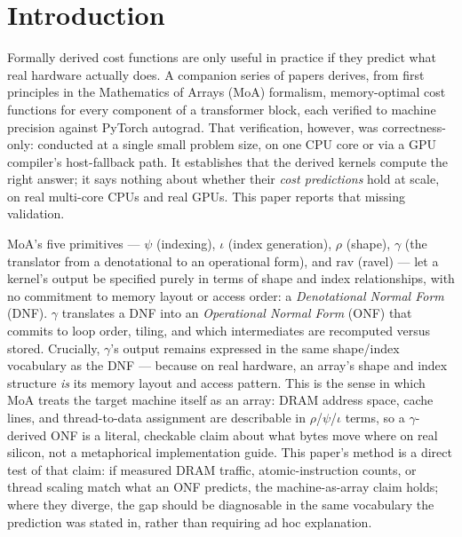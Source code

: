 \documentclass[conference]{IEEEtran}
\begin{document}
\section{Introduction}

Formally derived cost functions are only useful in practice if they
predict what real hardware actually does. A companion series of papers
derives, from first principles in the Mathematics of Arrays (MoA)
formalism, memory-optimal cost functions for every component of a
transformer block, each verified to machine precision against PyTorch
autograd. That verification, however, was correctness-only: conducted
at a single small problem size, on one CPU core or via a GPU compiler's
host-fallback path. It establishes that the derived kernels compute the
right answer; it says nothing about whether their \emph{cost
predictions} hold at scale, on real multi-core CPUs and real GPUs. This
paper reports that missing validation.

MoA's five primitives --- $\psi$ (indexing), $\iota$ (index
generation), $\rho$ (shape), $\gamma$ (the translator from a
denotational to an operational form), and $\mathrm{rav}$ (ravel) ---
let a kernel's output be specified purely in terms of shape and index
relationships, with no commitment to memory layout or access order: a
\emph{Denotational Normal Form} (DNF). $\gamma$ translates a DNF into
an \emph{Operational Normal Form} (ONF) that commits to loop order,
tiling, and which intermediates are recomputed versus stored.
Crucially, $\gamma$'s output remains expressed in the same
shape/index vocabulary as the DNF --- because on real hardware, an
array's shape and index structure \emph{is} its memory layout and
access pattern. This is the sense in which MoA treats the target
machine itself as an array: DRAM address space, cache lines, and
thread-to-data assignment are describable in $\rho$/$\psi$/$\iota$
terms, so a $\gamma$-derived ONF is a literal, checkable claim about
what bytes move where on real silicon, not a metaphorical
implementation guide. This paper's method is a direct test of that
claim: if measured DRAM traffic, atomic-instruction counts, or thread
scaling match what an ONF predicts, the machine-as-array claim holds;
where they diverge, the gap should be diagnosable in the same
vocabulary the prediction was stated in, rather than requiring ad hoc
explanation.
\end{document}

